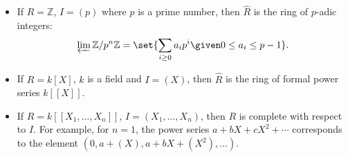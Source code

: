 \begin{itemize}
	\item If $R = \mathbb{Z}$, $I = (p)$ where $p$ is a prime number,
		then $\hat{R}$ is the ring of  $p$-adic integers:
		\[ \varprojlim \mathbb{Z}/p^n\mathbb{Z} = \set{\sum_{i\geq 0} a_ip^i\given 0\leq a_i\leq p - 1 }. \]
	\item If $R = k[X]$, $k$ is a field and $I = (X)$, then $\hat{R}$ is the ring
		of formal power series $k[[X]]$.
	\item If $R = k[[X_1, \ldots, X_n]]$, $I = (X_1, \ldots, X_n)$, then  $R$ is
		complete with respect to $I$. For example, for $n = 1$, the
		power series $a + bX + cX^2 + \cdots$ corresponds to the element
		$(0, a + (X), a + bX + (X^2), \ldots)$.
\end{itemize}
